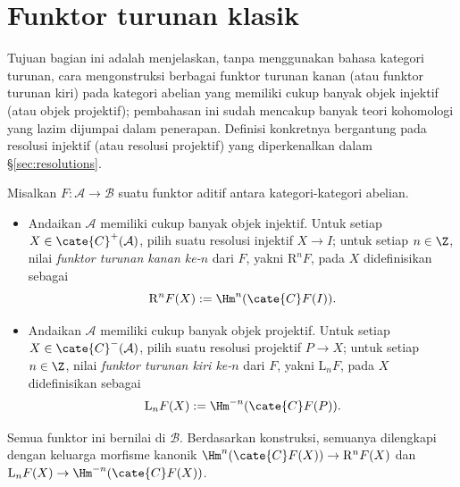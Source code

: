
\section{Funktor turunan klasik}\label{sec:derived-primer}
\hypertarget{o014.aljabr2.chapter3.classical-derived-functors}{ }
Tujuan bagian ini adalah menjelaskan, tanpa menggunakan bahasa kategori turunan, cara mengonstruksi berbagai funktor turunan kanan (atau funktor turunan kiri) pada kategori abelian yang memiliki cukup banyak objek injektif (atau objek projektif); pembahasan ini sudah mencakup banyak teori kohomologi yang lazim dijumpai dalam penerapan. Definisi konkretnya bergantung pada resolusi injektif (atau resolusi projektif) yang diperkenalkan dalam \S\ref{sec:resolutions}.

\begin{definisi}\label{def:derived-primer}
	Misalkan $F: \mathcal{A} \to \mathcal{B}$ suatu funktor aditif antara kategori-kategori abelian.
	\begin{itemize}
		\item Andaikan $\mathcal{A}$ memiliki cukup banyak objek injektif. Untuk setiap $X \in \cate{C}^{+}(\mathcal{A})$, pilih suatu resolusi injektif $X \to I$; untuk setiap $n \in \Z$, nilai \emph{funktor turunan kanan ke-$n$} dari $F$, yakni $\mathrm{R}^n F$, pada $X$ didefinisikan sebagai
		\[ \mathrm{R}^n F(X) := \Hm^n(\cate{C}F(I)). \]
		\item Andaikan $\mathcal{A}$ memiliki cukup banyak objek projektif. Untuk setiap $X \in \cate{C}^{-}(\mathcal{A})$, pilih suatu resolusi projektif $P \to X$; untuk setiap $n \in \Z$, nilai \emph{funktor turunan kiri ke-$n$} dari $F$, yakni $\mathrm{L}_n F$, pada $X$ didefinisikan sebagai
		\[ \mathrm{L}_n F(X) := \Hm^{-n}(\cate{C}F(P)). \]
	\end{itemize}
	Semua funktor ini bernilai di $\mathcal{B}$. Berdasarkan konstruksi, semuanya dilengkapi dengan keluarga morfisme kanonik $\Hm^n(\cate{C}F(X)) \to \mathrm{R}^n F(X)$ dan $\mathrm{L}_n F(X) \to \Hm^{-n}(\cate{C}F(X))$.
\end{definisi}

